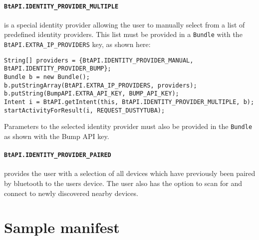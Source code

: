 \documentclass[a4paper,11pt]{article}
\begin{document}
\paragraph{{\tt BtAPI.IDENTITY\_PROVIDER\_MULTIPLE}}
is a special identity provider allowing the user to manually select from a list of predefined identity providers. This list must be provided in a \verb+Bundle+ with the \verb+BtAPI.EXTRA_IP_PROVIDERS+ key, as shown here:

\footnotesize
\begin{verbatim}
String[] providers = {BtAPI.IDENTITY_PROVIDER_MANUAL, BtAPI.IDENTITY_PROVIDER_BUMP};
Bundle b = new Bundle();
b.putStringArray(BtAPI.EXTRA_IP_PROVIDERS, providers);
b.putString(BumpAPI.EXTRA_API_KEY, BUMP_API_KEY);
Intent i = BtAPI.getIntent(this, BtAPI.IDENTITY_PROVIDER_MULTIPLE, b);
startActivityForResult(i, REQUEST_DUSTYTUBA);
\end{verbatim}
\normalsize

Parameters to the selected identity provider must also be provided in the \verb+Bundle+ as shown with the Bump\texttrademark{} API key.

\paragraph{{\tt BtAPI.IDENTITY\_PROVIDER\_PAIRED}}
provides the user with a selection of all devices which have previously been paired by bluetooth to the users device. The user also has the option to scan for and connect to newly discovered nearby devices.


\clearpage
\appendix

\section{Sample manifest}
\label{sample-manifest}
\end{document}
